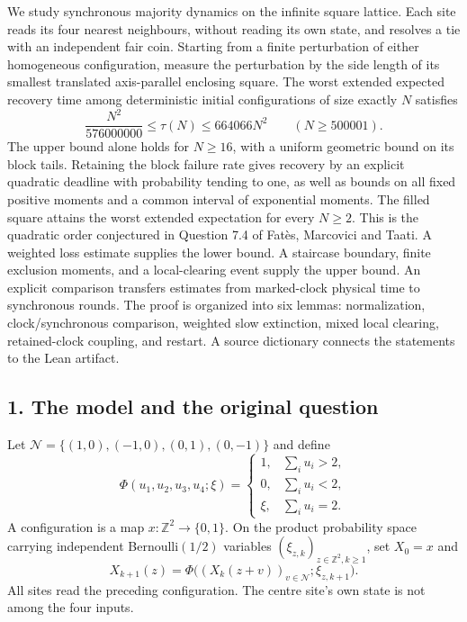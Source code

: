 \documentclass[
  11pt,
  a4paper,
]{article}
\begin{document}
We study synchronous majority dynamics on the infinite square lattice.
Each site reads its four nearest neighbours, without reading its own
state, and resolves a tie with an independent fair coin. Starting from a
finite perturbation of either homogeneous configuration, measure the
perturbation by the side length of its smallest translated axis-parallel
enclosing square. The worst extended expected recovery time among
deterministic initial configurations of size exactly \(N\) satisfies \[
\frac{N^2}{576000000}\leq\tau(N)\leq664066N^2
\qquad(N\geq500001).
\] The upper bound alone holds for \(N\geq16\), with a uniform geometric
bound on its block tails. Retaining the block failure rate gives
recovery by an explicit quadratic deadline with probability tending to
one, as well as bounds on all fixed positive moments and a common
interval of exponential moments. The filled square attains the worst
extended expectation for every \(N\geq2\). This is the quadratic order
conjectured in Question 7.4 of Fatès, Marcovici and Taati. A weighted
loss estimate supplies the lower bound. A staircase boundary, finite
exclusion moments, and a local-clearing event supply the upper bound. An
explicit comparison transfers estimates from marked-clock physical time
to synchronous rounds. The proof is organized into six lemmas:
normalization, clock/synchronous comparison, weighted slow extinction,
mixed local clearing, retained-clock coupling, and restart. A source
dictionary connects the statements to the Lean artifact.

\subsection{1. The model and the original
question}\label{the-model-and-the-original-question}

Let \(\mathcal N=\{(1,0),(-1,0),(0,1),(0,-1)\}\) and define \[
\Phi(u_1,u_2,u_3,u_4;\xi)=
\begin{cases}
1,&\sum_i u_i>2,\\
0,&\sum_i u_i<2,\\
\xi,&\sum_i u_i=2.
\end{cases}
\] A configuration is a map \(x:\mathbb Z^2\to\{0,1\}\). On the product
probability space carrying independent Bernoulli\((1/2)\) variables
\((\xi_{z,k})_{z\in\mathbb Z^2,k\geq1}\), set \(X_0=x\) and \[
X_{k+1}(z)=\Phi\bigl((X_k(z+v))_{v\in\mathcal N};\xi_{z,k+1}\bigr).
\tag{1}
\] All sites read the preceding configuration. The centre site's own
state is not among the four inputs.
\end{document}
